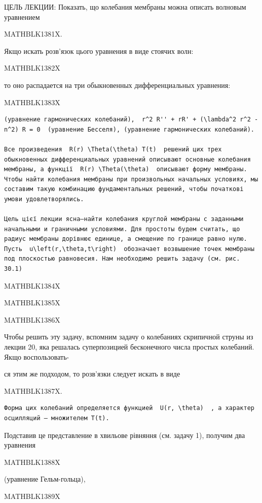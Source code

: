 \documentclass[
  ukrainian,
]{article}
\begin{document}
ЦЕЛЬ ЛЕКЦИИ: Показать, що колебания мембраны можна описать волновым
уравнением

MATHBLK1381X.

Якщо искать розв'язок цього уравнения в виде стоячих волн:

MATHBLK1382X

то оно распадается на три обыкновенных дифференциальных уравнения:

MATHBLK1383X

\begin{verbatim}
(уравнение гармонических колебаний),  r^2 R'' + rR' + (\lambda^2 r^2 - n^2) R = 0  (уравнение Бесселя), (уравнение гармонических колебаний).

Все произведения  R(r) \Theta(\theta) T(t)  решений цих трех обыкновенных дифференциальных уравнений описывают основные колебания мембраны, а функції  R(r) \Theta(\theta)  описывают форму мембраны. Чтобы найти колебания мембраны при произвольных начальных условиях, мы составим такую комбинацию фундаментальных решений, чтобы початкові умови удовлетворялись.

Цель цієї лекции ясна—найти колебания круглой мембраны с заданными начальными и граничными условиями. Для простоты будем считать, що радиус мембраны дорівнює единице, а смещение по границе равно нулю. Пусть  u\left(r,\theta,t\right)  обозначает возвышение точек мембраны под плоскостью равновесия. Нам необходимо решить задачу (см. рис. 30.1)
\end{verbatim}

MATHBLK1384X

MATHBLK1385X

MATHBLK1386X

Чтобы решить эту задачу, вспомним задачу о колебаниях скрипичной струны
из лекции 20, яка решалась суперпозицией бесконечного числа простых
колебаний. Якщо воспользовать-

ся этим же подходом, то розв'язки следует искать в виде

MATHBLK1387X.

\begin{verbatim}
Форма цих колебаний определяется функцией  U(r, \theta)  , а характер осцилляций — множителем T(t).
\end{verbatim}

Подставив це представление в хвильове рівняння (см. задачу 1), получим
два уравнения

MATHBLK1388X

(уравнение Гельм-гольца),

MATHBLK1389X
\end{document}
